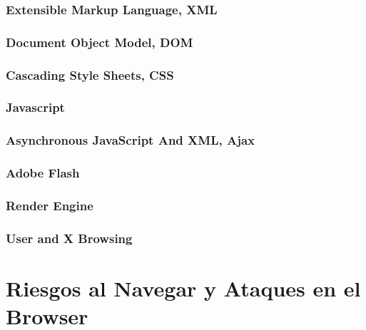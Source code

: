 \subsubsection{Extensible Markup Language, XML}
\label{sec:chap2.1.2.2}


\subsubsection{Document Object Model, DOM}
\label{sec:chap2.1.2.3}


\subsubsection{Cascading Style Sheets, CSS}
\label{sec:chap2.1.2.4}


\subsubsection{Javascript}
\label{sec:chap2.1.2.5}


\subsubsection{Asynchronous JavaScript And XML, Ajax}
\label{sec:chap2.1.2.6}


\subsubsection{Adobe Flash}
\label{sec:chap2.1.2.7}


\subsubsection{Render Engine}
\label{sec:chap2.1.2.8}


\subsubsection{User and X Browsing}
\label{sec:chap2.1.2.9}



\section{Riesgos al Navegar y Ataques en el Browser}
\label{sec:chap2.2}


